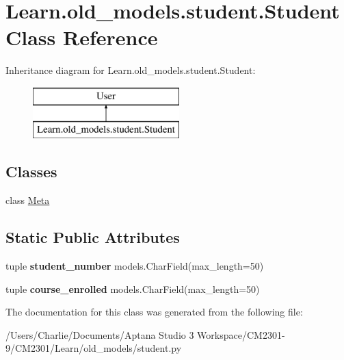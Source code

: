 \hypertarget{class_learn_1_1old__models_1_1student_1_1_student}{\section{Learn.\-old\-\_\-models.\-student.\-Student Class Reference}
\label{class_learn_1_1old__models_1_1student_1_1_student}
}
Inheritance diagram for Learn.\-old\-\_\-models.\-student.\-Student\-:\begin{figure}[H]
\begin{center}
\leavevmode
\includegraphics[height=2.000000cm]{class_learn_1_1old__models_1_1student_1_1_student}
\end{center}
\end{figure}
\subsection*{Classes}
\begin{DoxyCompactItemize}
\item 
class \hyperlink{class_learn_1_1old__models_1_1student_1_1_student_1_1_meta}{Meta}
\end{DoxyCompactItemize}
\subsection*{Static Public Attributes}
\begin{DoxyCompactItemize}
\item 
\hypertarget{class_learn_1_1old__models_1_1student_1_1_student_a1011bce73e302f1ec27b71ac0bf19507}{tuple {\bfseries student\-\_\-number} models.\-Char\-Field(max\-\_\-length=50)}\label{class_learn_1_1old__models_1_1student_1_1_student_a1011bce73e302f1ec27b71ac0bf19507}

\item 
\hypertarget{class_learn_1_1old__models_1_1student_1_1_student_a6685bee108a5a1d42f09ba5c4f6e32be}{tuple {\bfseries course\-\_\-enrolled} models.\-Char\-Field(max\-\_\-length=50)}\label{class_learn_1_1old__models_1_1student_1_1_student_a6685bee108a5a1d42f09ba5c4f6e32be}

\end{DoxyCompactItemize}


The documentation for this class was generated from the following file\-:\begin{DoxyCompactItemize}
\item 
/\-Users/\-Charlie/\-Documents/\-Aptana Studio 3 Workspace/\-C\-M2301-\/9/\-C\-M2301/\-Learn/old\-\_\-models/student.\-py\end{DoxyCompactItemize}
